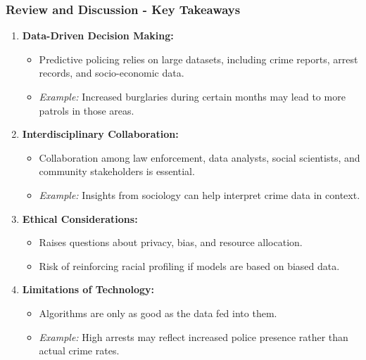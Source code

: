 \documentclass[aspectratio=169]{beamer}
\begin{document}
\begin{frame}[fragile]
    \frametitle{Review and Discussion - Key Takeaways}
    \begin{enumerate}
        \item \textbf{Data-Driven Decision Making:}
        \begin{itemize}
            \item Predictive policing relies on large datasets, including crime reports, arrest records, and socio-economic data.
            \item \textit{Example:} Increased burglaries during certain months may lead to more patrols in those areas.
        \end{itemize}

        \item \textbf{Interdisciplinary Collaboration:}
        \begin{itemize}
            \item Collaboration among law enforcement, data analysts, social scientists, and community stakeholders is essential.
            \item \textit{Example:} Insights from sociology can help interpret crime data in context.
        \end{itemize}

        \item \textbf{Ethical Considerations:}
        \begin{itemize}
            \item Raises questions about privacy, bias, and resource allocation.
            \item Risk of reinforcing racial profiling if models are based on biased data.
        \end{itemize}

        \item \textbf{Limitations of Technology:}
        \begin{itemize}
            \item Algorithms are only as good as the data fed into them.
            \item \textit{Example:} High arrests may reflect increased police presence rather than actual crime rates.
        \end{itemize}
    \end{enumerate}
\end{frame}
\end{document}
